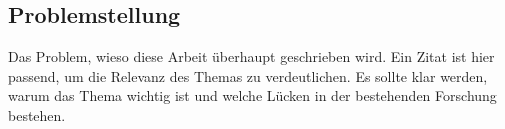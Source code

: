 \subsection{Problemstellung} \label{sec:problemstellung}

Das Problem, wieso diese Arbeit überhaupt geschrieben wird. Ein Zitat ist hier passend, um die Relevanz des Themas zu verdeutlichen. Es sollte klar werden, warum das Thema wichtig ist und welche Lücken in der bestehenden Forschung bestehen.
